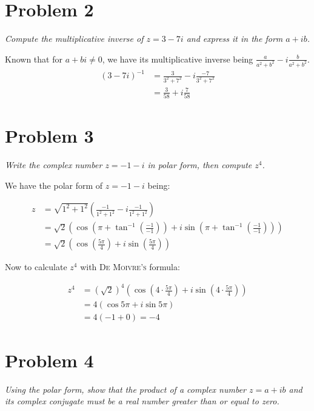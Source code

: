 \documentclass[11pt]{article}
\begin{document}
\section*{Problem 2}

\textit{Compute the multiplicative inverse of $z = 3 - 7i$ and express it in the form $a+ib$.}\newline

Known that for $a + bi \neq 0$, we have its multiplicative inverse being $\frac{a}{a^2 + b^2} - i\frac{b}{a^2 + b^2} $.
\begin{align*}
    (3 - 7i)^{-1} &= \frac{3}{3^2 + 7^2} - i\frac{-7}{3^2 + 7^2} \\
    &= \frac{3}{58} + i\frac{7}{58}
\end{align*}

\section*{Problem 3}
\textit{Write the complex number $z = -1 - i$ in polar form, then compute $z^4$.}\newline

We have the polar form of $z = -1 - i$ being:

\begin{align*}
    z &= \sqrt{1^2 + 1^2}(\frac{-1}{1^2 + 1^2} - i\frac{-1}{1^2 + 1^2}) \\
    &= \sqrt{2}(\cos (\pi + \tan^{-1}(\frac{-1}{-1})) + i\sin( \pi + \tan^{-1}(\frac{-1}{-1})) ) \\
    &= \sqrt{2}(\cos (\frac{5 \pi}{4}) + i\sin (\frac{5 \pi}{4}) )
\end{align*}

Now to calculate $z^4$ with \textsc{De Moivre's} formula:

\begin{align*}
    z^4 &= (\sqrt{2})^4(\cos (4 \cdot \frac{5 \pi}{4}) + i\sin (4 \cdot \frac{5 \pi}{4}) ) \\
    &= 4 (\cos 5\pi + i\sin 5\pi ) \\
    &= 4(-1 + 0) = -4
\end{align*}

\section*{Problem 4}
\textit{Using the polar form, show that the product of a complex number $z = a + ib$ and its complex conjugate must be a real number greater than or equal to zero.}\newline
\end{document}
